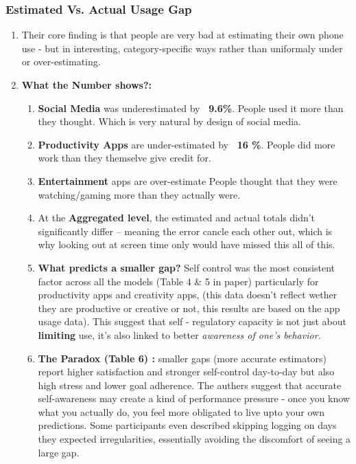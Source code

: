 \documentclass[12pt]{article}
\begin{document}
\subsubsection{Estimated Vs. Actual Usage Gap}
\begin{enumerate}
    \item Their core finding is that people are very bad at estimating their own phone use - but in interesting, category-specific ways rather than uniformaly under or over-estimating.
    \item \textbf{What the Number shows?: }
    \begin{enumerate}
        \item \textbf{Social Media} was underestimated by \textbf{~9.6\%}. People used it more than they thought. Which is very natural by design of social media.
        \item \textbf{Productivity Apps} are under-estimated by \textbf{~16 \%}. People did more work than they themselve give credit for.
        \item \textbf{Entertainment} apps are over-estimate People thought that they were watching/gaming more than they actually were.
        \item At the \textbf{Aggregated level}, the estimated and actual totals didn't significantly differ -- meaning the error cancle each other out, which is why looking out at screen time only would have missed this all of this.
        \item \textbf{What predicts a smaller gap?} Self control was the most consistent factor across all the models (Table  4 \& 5 in paper) particularly for productivity apps and creativity apps, (this data doesn't reflect wether they are productive or creative or not, this results are based on the app usage data). This suggest that self - regulatory capacity is not just about \textbf{limiting} use, it's also linked to better \textit{awareness of one's behavior. } 
        \item \textbf{The Paradox (Table 6) :} smaller gaps (more accurate estimators) report higher satisfaction and stronger self-control day-to-day but also high stress and lower goal adherence. The authers suggest that accurate self-awareness may create a kind of performance pressure - once you know what you actually do, you feel more obligated to live upto your own predictions. Some participants even described skipping logging on days they expected irregularities, essentially avoiding the discomfort of seeing a large gap. 
    \end{enumerate}
\end{enumerate}
\end{document}
